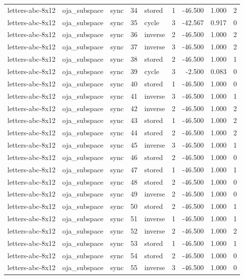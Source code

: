 \begin{tabular}{lllrlrrrr}
letters-abc-8x12 & oja\_subspace & sync & 34 & stored & 1 & -46.500 & 1.000 & 2 \\
letters-abc-8x12 & oja\_subspace & sync & 35 & cycle & 3 & -42.567 & 0.917 & 0 \\
letters-abc-8x12 & oja\_subspace & sync & 36 & inverse & 2 & -46.500 & 1.000 & 2 \\
letters-abc-8x12 & oja\_subspace & sync & 37 & inverse & 3 & -46.500 & 1.000 & 2 \\
letters-abc-8x12 & oja\_subspace & sync & 38 & stored & 2 & -46.500 & 1.000 & 1 \\
letters-abc-8x12 & oja\_subspace & sync & 39 & cycle & 3 & -2.500 & 0.083 & 0 \\
letters-abc-8x12 & oja\_subspace & sync & 40 & stored & 1 & -46.500 & 1.000 & 0 \\
letters-abc-8x12 & oja\_subspace & sync & 41 & inverse & 3 & -46.500 & 1.000 & 1 \\
letters-abc-8x12 & oja\_subspace & sync & 42 & inverse & 2 & -46.500 & 1.000 & 2 \\
letters-abc-8x12 & oja\_subspace & sync & 43 & stored & 1 & -46.500 & 1.000 & 2 \\
letters-abc-8x12 & oja\_subspace & sync & 44 & stored & 2 & -46.500 & 1.000 & 2 \\
letters-abc-8x12 & oja\_subspace & sync & 45 & inverse & 3 & -46.500 & 1.000 & 1 \\
letters-abc-8x12 & oja\_subspace & sync & 46 & stored & 2 & -46.500 & 1.000 & 0 \\
letters-abc-8x12 & oja\_subspace & sync & 47 & stored & 1 & -46.500 & 1.000 & 1 \\
letters-abc-8x12 & oja\_subspace & sync & 48 & stored & 2 & -46.500 & 1.000 & 0 \\
letters-abc-8x12 & oja\_subspace & sync & 49 & inverse & 2 & -46.500 & 1.000 & 0 \\
letters-abc-8x12 & oja\_subspace & sync & 50 & stored & 2 & -46.500 & 1.000 & 1 \\
letters-abc-8x12 & oja\_subspace & sync & 51 & inverse & 1 & -46.500 & 1.000 & 1 \\
letters-abc-8x12 & oja\_subspace & sync & 52 & inverse & 2 & -46.500 & 1.000 & 2 \\
letters-abc-8x12 & oja\_subspace & sync & 53 & stored & 1 & -46.500 & 1.000 & 1 \\
letters-abc-8x12 & oja\_subspace & sync & 54 & stored & 2 & -46.500 & 1.000 & 0 \\
letters-abc-8x12 & oja\_subspace & sync & 55 & inverse & 3 & -46.500 & 1.000 & 0 \\

\end{tabular}
